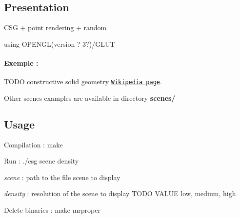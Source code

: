 \subsection*{Presentation}


\begin{DoxyItemize}
\item C\+SG + point rendering + random
\item using O\+P\+E\+N\+GL(version ? 3?)/\+G\+L\+UT
\end{DoxyItemize}

\paragraph*{Exemple \+:}







T\+O\+DO constructive solid geometry \href{https://en.wikipedia.org/wiki/Constructive_solid_geometry}{\tt Wikipedia page}.





Other scenes examples are available in directory {\bfseries scenes/}

\subsection*{Usage}


\begin{DoxyItemize}
\item Compilation \+: {\ttfamily make}
\item Run \+: {\ttfamily ./csg scene density}
\begin{DoxyItemize}
\item {\itshape scene} \+: path to the file scene to display
\item {\itshape density} \+: resolution of the scene to display T\+O\+DO V\+A\+L\+UE low, medium, high
\end{DoxyItemize}
\item Delete binaries \+: {\ttfamily make mrproper} 
\end{DoxyItemize}